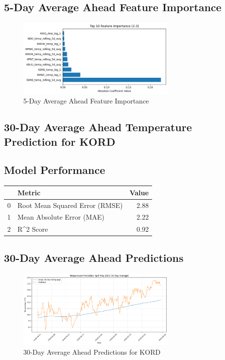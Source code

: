 \subsection{5-Day Average Ahead Feature Importance}
\begin{figure}[htbp]
\centering
\includegraphics[width=0.7\textwidth]{2-3-gradient_boost_temp_shift_feature_importance.png}
\caption{5-Day Average Ahead Feature Importance}
\label{fig:5-day_average_ahead_featimp}
\end{figure}



\subsection{30-Day Average Ahead Temperature Prediction for KORD}
\subsection{Model Performance}
\begin{tabular}{llr}
\toprule
 & Metric & Value \\
\midrule
0 & Root Mean Squared Error (RMSE) & 2.88 \\
1 & Mean Absolute Error (MAE) & 2.22 \\
2 & R^2 Score & 0.92 \\
\bottomrule
\end{tabular}

\subsection{30-Day Average Ahead Predictions}
\begin{figure}[htbp]
\centering
\includegraphics[width=0.7\textwidth]{2-4-gradient_boost_temp_shift_results.png}
\caption{30-Day Average Ahead Predictions for KORD}
\label{fig:30-day_average_ahead_pred}
\end{figure}

